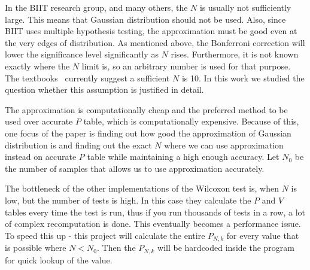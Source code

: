 \documentclass[12pt]{article}
\begin{document}
{In the BIIT research group, and many others, the $N$ is usually not sufficiently large. This means that Gaussian distribution should not be used. Also, since BIIT uses multiple hypothesis testing, the approximation must be good even at the very edges of distribution. As mentioned above, the Bonferroni correction will lower the significance level significantly as $N$ rises. Furthermore, it is not known exactly where the $N$ limit is, so an arbitrary number is used for that purpose. The textbooks~\cite{lowry_concepts} currently suggest a sufficient $N$ is 10. In this work we studied the question whether this assumption is justified in detail.

The approximation is computationally cheap and the preferred method to be used over accurate $P$ table, which is computationally expensive. Because of this, one focus of the paper is finding out how good the approximation of Gaussian distribution is and finding out the exact $N$ where we can use approximation instead on accurate $P$ table while maintaining a high enough accuracy. Let $N_0$ be the number of samples that allows us to use approximation accurately.

The bottleneck of the other implementations of the Wilcoxon test is, when $N$ is low, but the number of tests is high. In this case they calculate the $P$ and $V$ tables every time the test is run, thus if you run thousands of tests in a row, a lot of complex recomputation is done. This eventually becomes a performance issue. To speed this up - this project will calculate the entire $P_{N, k}$ for every value that is possible where $N < N_0$. Then the $P_{N, k}$ will be hardcoded inside the program for quick lookup of the value.


}
\end{document}
